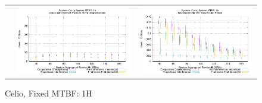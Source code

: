 \documentclass[conference]{IEEEtran}
\begin{document}
\begin{figure}[t]
\begin{tabular}{C{.02\linewidth}C{.49\linewidth}C{.49\linewidth}}
 & \includegraphics[width=\linewidth]{sim/figures/1hMTBF-1hckpt-io-celio.pdf} & \includegraphics[width=\linewidth]{sim/figures/1hMTBF-dalyckpt-io-celio.pdf}
\end{tabular}
\caption{Celio, Fixed MTBF: 1H}
\end{figure}

\clearpage
\end{document}
